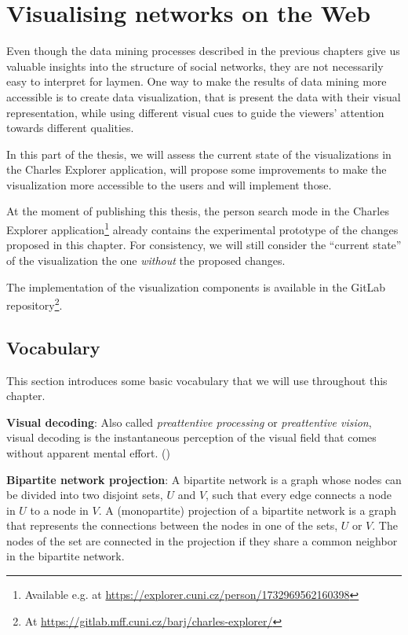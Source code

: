 \chapter{Visualising networks on the Web}

Even though the data mining processes described in the previous chapters give us valuable insights into the structure of social networks, 
they are not necessarily easy to interpret for laymen.
One way to make the results of data mining more accessible is to create data visualization, that is present the data with their visual representation, 
while using different visual cues to guide the viewers' attention towards different qualities.

In this part of the thesis, we will assess the current state of the visualizations in the Charles Explorer application, 
will propose some improvements to make the visualization more accessible to the users and will implement those.

At the moment of publishing this thesis, the person search mode in the Charles Explorer application\footnote{Available e.g. at \url{https://explorer.cuni.cz/person/1732969562160398}} already contains the experimental prototype of the changes proposed in this chapter.
For consistency, we will still consider the ``current state'' of the visualization the one \textit{without} the proposed changes.

The implementation of the visualization components is available in the GitLab repository\footnote{At \url{https://gitlab.mff.cuni.cz/barj/charles-explorer/}}.

\section{Vocabulary}

This section introduces some basic vocabulary that we will use throughout this chapter.

\textbf{Visual decoding}: Also called \textit{preattentive processing} or \textit{preattentive vision}, visual decoding is the instantaneous perception of the visual field that comes without apparent mental effort. (\cite{Cleveland1985})

\textbf{Bipartite network projection}: A bipartite network is a graph whose nodes can be divided into two disjoint sets, $U$ and $V$, such that every edge connects a node in $U$ to a node in $V$.
A (monopartite) projection of a bipartite network is a graph that represents the connections between the nodes in one of the sets, $U$ or $V$.
The nodes of the set are connected in the projection if they share a common neighbor in the bipartite network.

